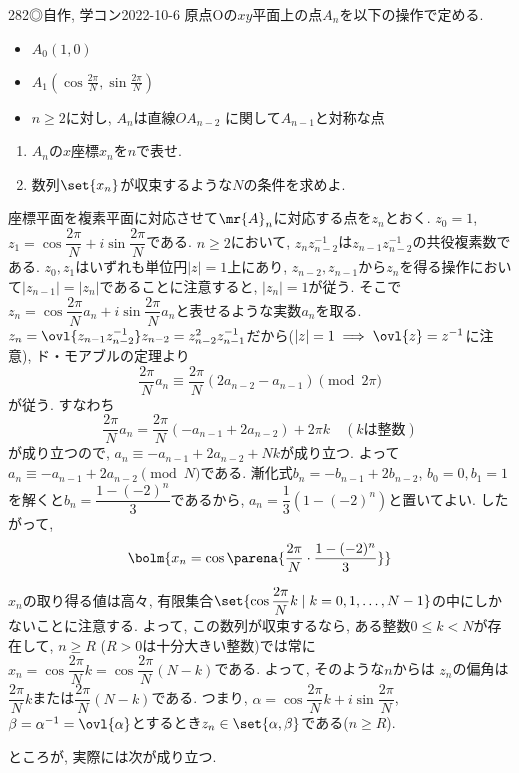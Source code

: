 \begin{thm}{282}{◎}{自作, 学コン2022-10-6}
原点Oの$xy$平面上の点$A_n$を以下の操作で定める. 
\begin{itemize}
\item $A_0(1,0)$
\item $A_1(\cos{\frac{2\pi}{N}}, \sin{\frac{2\pi}{N}} )$
\item $n\geq 2$に対し, $A_n$は直線$OA_{n-2}$ に関して$A_{n-1}$と対称な点
\end{itemize}
\begin{enumerate}
\item $A_n$の$x$座標$x_n$を$n$で表せ. 
\item 数列$\set{x_n}$が収束するような$N$の条件を求めよ. 
\end{enumerate}
\end{thm}


座標平面を複素平面に対応させて$\mr{A}_n$に対応する点を$z_n$とおく. $z_0=1$, $z_1 = \cos{\dfrac{2\pi}{N}} + i\sin{\dfrac{2\pi}{N}}$である.  $n\geq 2$において, $z_{n}z_{n-2}^{-1}$は$z_{n-1}z_{n-2}^{-1}$の共役複素数である. $z_0,z_1$はいずれも単位円$|z|=1$上にあり, $z_{n-2},z_{n-1}$から$z_n$を得る操作において$|z_{n-1}|=|z_n|$であることに注意すると, $|z_n|=1$が従う. そこで$z_n = \cos{\dfrac{2\pi}{N}a_n} + i\sin{\dfrac{2\pi}{N}a_n}$と表せるような実数$a_n$を取る. $z_n = \ovl{z_{n-1}z_{n-2}^{-1}}z_{n-2} = z_{n-2}^{2}z_{n-1}^{-1}$だから($|z|=1\implies \ovl{z} = z^{-1}$に注意), ド・モアブルの定理より
\[\dfrac{2\pi}{N}a_{n} \equiv \dfrac{2\pi}{N}(2a_{n-2} - a_{n-1})\pmod{2\pi}\]
が従う. すなわち
\[\dfrac{2\pi}{N}a_n = \dfrac{2\pi}{N}(-a_{n-1} + 2a_{n-2}) + 2\pi k\quad (kは整数)\]
が成り立つので, $a_{n} \equiv -a_{n-1} + 2a_{n-2} + Nk$が成り立つ.
よって$a_n \equiv -a_{n-1} + 2a_{n-2} \pmod{N}$である. 漸化式$b_{n} = -b_{n-1} + 2b_{n-2}$, $b_0=0, b_1=1$を解くと$b_n = \dfrac{1-(-2)^n}{3}$であるから, $a_n = \dfrac{1}{3}(1-(-2)^n)$と置いてよい. したがって, 
\[\bolm{x_n = \cos{\parena{\dfrac{2\pi}{N}\cdot \dfrac{1-(-2)^n}{3}}}}\]


$x_n$の取り得る値は高々, 有限集合$\set{\cos{\dfrac{2\pi}{N}k}\mid k=0,1,\dots, N-1}$の中にしかないことに注意する. 
よって, この数列が収束するなら, ある整数$0\leq k < N$が存在して, $n\geq R$ ($R>0$は十分大きい整数)では常に$x_n = \cos{\dfrac{2\pi}{N}k} = \cos{\dfrac{2\pi}{N}(N-k)}$である. よって, そのような$n$からは $z_n$の偏角は$\dfrac{2\pi}{N}k$または$\dfrac{2\pi}{N}(N-k)$である. つまり, $\alpha = \cos{\dfrac{2\pi}{N}k} + i\sin{\dfrac{2\pi}{N}}$, $\beta = \alpha^{-1} = \ovl{\alpha}$とするとき$z_n \in \set{\alpha,\beta}$である($n\geq R$). \par 
ところが, 実際には次が成り立つ. 
 
